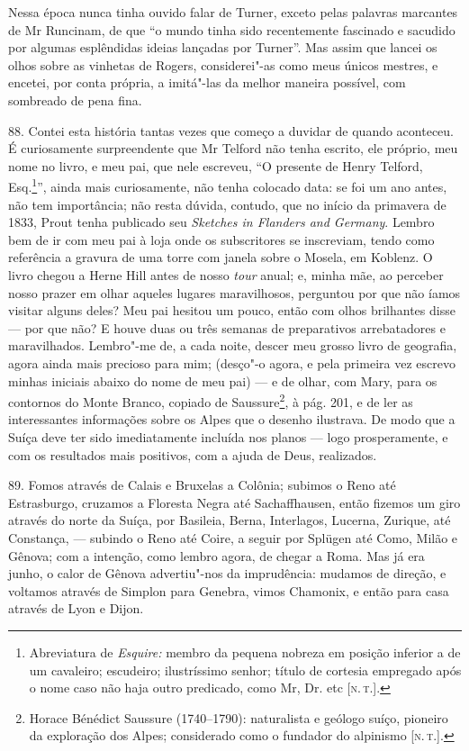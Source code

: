 Nessa época nunca tinha ouvido falar de Turner, exceto pelas palavras
marcantes de Mr Runcinam, de que ``o mundo tinha sido recentemente
fascinado e sacudido por algumas esplêndidas ideias lançadas por
Turner''. Mas assim que lancei os olhos sobre as vinhetas de Rogers,
considerei"-as como meus únicos mestres, e encetei, por conta própria, a
imitá"-las da melhor maneira possível, com sombreado de pena fina.

88. Contei esta história tantas vezes que começo a duvidar de quando
aconteceu. É curiosamente surpreendente que Mr Telford não tenha
escrito, ele próprio, meu nome no livro, e meu pai, que nele escreveu,
``O presente de Henry Telford, Esq.\footnote{Abreviatura de
  \emph{Esquire:} membro da pequena nobreza em posição inferior a de um
  cavaleiro; escudeiro; ilustríssimo senhor; título de cortesia
  empregado após o nome caso não haja outro predicado, como Mr, Dr. etc
  {[}\textsc{n.\,t.}{]}.}'', ainda mais curiosamente, não tenha colocado data:
se foi um ano antes, não tem importância; não resta dúvida, contudo, que
no início da primavera de 1833, Prout tenha publicado seu \emph{Sketches
in Flanders and Germany}. Lembro bem de ir com meu pai à loja onde os
subscritores se inscreviam, tendo como referência a gravura de uma torre
com janela sobre o Mosela, em Koblenz. O livro chegou a Herne Hill antes
de nosso \emph{tour} anual; e, minha mãe, ao perceber nosso prazer em
olhar aqueles lugares maravilhosos, perguntou por que não íamos visitar
alguns deles? Meu pai hesitou um pouco, então com olhos brilhantes disse
--- por que não? E houve duas ou três semanas de preparativos
arrebatadores e maravilhados. Lembro"-me de, a cada noite, descer meu
grosso livro de geografia, agora ainda mais precioso para mim; (desço"-o
agora, e pela primeira vez escrevo minhas iniciais abaixo do nome de meu
pai) --- e de olhar, com Mary, para os contornos do Monte Branco, copiado
de Saussure\footnote{Horace Bénédict Saussure (1740--1790): naturalista e
  geólogo suíço, pioneiro da exploração dos Alpes; considerado como o
  fundador do alpinismo {[}\textsc{n.\,t.}{]}.}, à pág. 201, e de ler as
interessantes informações sobre os Alpes que o desenho ilustrava. De
modo que a Suíça deve ter sido imediatamente incluída nos planos --- logo
prosperamente, e com os resultados mais positivos, com a ajuda de Deus,
realizados.

89. Fomos através de Calais e Bruxelas a Colônia; subimos o Reno até
Estrasburgo, cruzamos a Floresta Negra até Sachaffhausen, então fizemos
um giro através do norte da Suíça, por Basileia, Berna, Interlagos,
Lucerna, Zurique, até Constança, --- subindo o Reno até Coire, a seguir
por Splügen até Como, Milão e Gênova; com a intenção, como lembro agora,
de chegar a Roma. Mas já era junho, o calor de Gênova advertiu"-nos da
imprudência: mudamos de direção, e voltamos através de Simplon para
Genebra, vimos Chamonix, e então para casa através de Lyon e Dijon.

